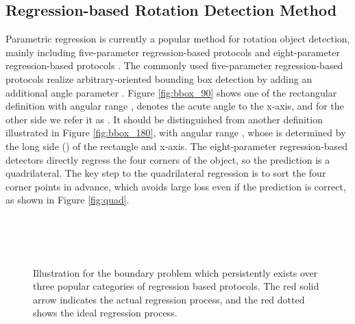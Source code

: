 \documentclass[10pt,journal,compsoc]{IEEEtran}
\begin{document}
\subsection{Regression-based Rotation Detection Method}
Parametric regression is currently a popular method for rotation object detection, mainly including five-parameter regression-based protocols \cite{yang2018automatic, yang2019scrdet, yang2021r3det, ma2018arbitrary, ding2018learning, jiang2017r2cnn} and eight-parameter regression-based protocols \cite{liao2018textboxes++, liu2019omnidirectional, qian2021learning, xu2020gliding}. The commonly used five-parameter regression-based protocols realize arbitrary-oriented bounding box detection by adding an additional angle parameter . Figure \ref{fig:bbox_90} shows one of the rectangular definition  with  angular range \cite{yang2018automatic, yang2019scrdet, yang2021r3det, ma2018arbitrary},  denotes the acute angle to the x-axis, and for the other side we refer it as . It should be distinguished from another definition  illustrated in Figure \ref{fig:bbox_180}, with  angular range \cite{ding2018learning, ma2018arbitrary}, whose  is determined by the long side () of the rectangle and x-axis. The eight-parameter regression-based detectors directly regress the four corners  of the object, so the prediction is a quadrilateral. The key step to the quadrilateral regression is to sort the four corner points in advance, which  avoids large loss even if the prediction is correct, as shown in Figure \ref{fig:quad}.

\begin{figure}[!tb]
	\centering
	\\
	\\
	\\
	\centering
	\caption{Illustration for the boundary problem which persistently exists over three popular categories of regression based protocols. The red solid arrow indicates the actual regression process, and the red dotted shows the ideal regression process.}
	\label{fig:problem}
\end{figure}
\end{document}
